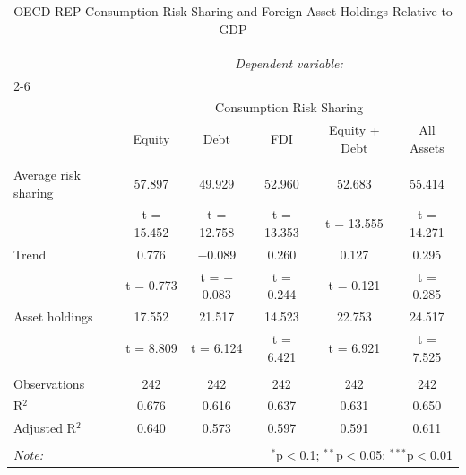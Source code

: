 
\begin{table}[!htbp] \centering 
  \caption{OECD REP Consumption Risk Sharing and Foreign Asset Holdings Relative to GDP} 
  \label{} 
\begin{tabular}{@{\extracolsep{5pt}}lccccc} 
\\[-1.8ex]\hline 
\hline \\[-1.8ex] 
 & \multicolumn{5}{c}{\textit{Dependent variable:}} \\ 
\cline{2-6} 
\\[-1.8ex] & \multicolumn{5}{c}{Consumption Risk Sharing} \\ 
 & Equity & Debt & FDI & Equity + Debt & All Assets \\ 
\hline \\[-1.8ex] 
 Average risk sharing & 57.897 & 49.929 & 52.960 & 52.683 & 55.414 \\ 
  & t = 15.452 & t = 12.758 & t = 13.353 & t = 13.555 & t = 14.271 \\ 
  Trend & 0.776 & $-$0.089 & 0.260 & 0.127 & 0.295 \\ 
  & t = 0.773 & t = $-$0.083 & t = 0.244 & t = 0.121 & t = 0.285 \\ 
  Asset holdings & 17.552 & 21.517 & 14.523 & 22.753 & 24.517 \\ 
  & t = 8.809 & t = 6.124 & t = 6.421 & t = 6.921 & t = 7.525 \\ 
 \hline \\[-1.8ex] 
Observations & 242 & 242 & 242 & 242 & 242 \\ 
R$^{2}$ & 0.676 & 0.616 & 0.637 & 0.631 & 0.650 \\ 
Adjusted R$^{2}$ & 0.640 & 0.573 & 0.597 & 0.591 & 0.611 \\ 
\hline 
\hline \\[-1.8ex] 
\textit{Note:}  & \multicolumn{5}{r}{$^{*}$p$<$0.1; $^{**}$p$<$0.05; $^{***}$p$<$0.01} \\ 
\end{tabular} 
\end{table} 
